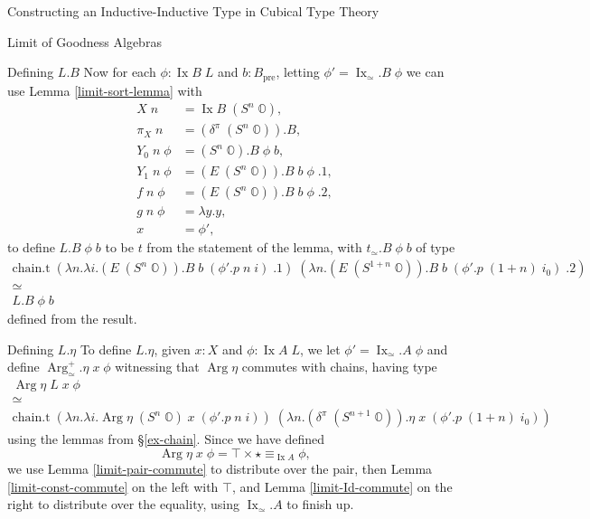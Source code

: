 \documentclass[runningheads]{llncs}
\DeclareMathOperator{\Arg}{Arg}
\DeclareMathOperator{\Ix}{Ix}
\newcommand{\pre}[1]{{#1}_\text{pre}}
\newcommand{\IdA}[3]{{#1}\equiv_{#3}{#2}}
\newcommand{\bbO}{\mathbb{O}}
\begin{document}
\begin{section}{Constructing an Inductive-Inductive Type in Cubical Type Theory}
\begin{subsection}{Limit of Goodness Algebras}
{\begin{subsubsection}{Defining $L.B$}
Now for each $\phi : \Ix B\;L$ and $b : \pre{B}$, letting $\phi' = \Ix_\simeq.B\;\phi$ we can use Lemma \ref{limit-sort-lemma} with \begin{align*}
X\;n &= \Ix B\;(S^n\;\bbO),\\
\pi_X\;n &= (\delta^\pi\;(S^n\;\bbO)).B,\\
Y_0\;n\;\phi &= (S^n\;\bbO).B\;\phi\;b,\\
Y_1\;n\;\phi &= (E\;(S^n\;\bbO)).B\;b\;\phi\;.1,\\
f\;n\;\phi &= (E\;(S^n\;\bbO)).B\;b\;\phi\;.2,\\
g\;n\;\phi &= \lambda y.y,\\
x &= \phi',
\end{align*}
to define $L.B\;\phi\;b$ to be $t$ from the statement of the lemma, with $t_\simeq.B\;\phi\;b$ of type \begin{gather*}
\text{chain.t}\;(\lambda n.\lambda i.(E\;(S^n\;\bbO)).B\;b\;(\phi'.p\;n\;i)\;.1)\;(\lambda n.(E\;(S^{1+n}\;\bbO)).B\;b\;(\phi'.p\;(1+n)\;i_0)\;.2)\\\simeq\\L.B\;\phi\;b
\end{gather*} defined from the result.
\end{subsubsection}

\begin{subsubsection}{Defining $L.\eta$}
To define $L.\eta$, given $x : X$ and $\phi : \Ix A\;L$, we let $\phi' = \Ix_\simeq.A\;\phi$ and define $\Arg_\simeq^+.\eta\;x\;\phi$ witnessing that $\Arg\eta$ commutes with chains, having type
\begin{gather*}
\Arg\eta\;L\;x\;\phi\\
\simeq\\
\text{chain.t}\;(\lambda n.\lambda i.\Arg\eta\;(S^n\;\bbO)\;x\;(\phi'.p\;n\;i))\;(\lambda n.(\delta^\pi\;(S^{n+1}\;\bbO)).\eta\;x\;(\phi'.p\;(1+n)\;i_0))
\end{gather*} using the lemmas from \S\ref{ex-chain}. Since we have defined \[\Arg\eta\;x\;\phi = \top \times \IdA{\star}{\phi}{\Ix A},\] we use Lemma \ref{limit-pair-commute} to distribute over the pair, then Lemma \ref{limit-const-commute} on the left with $\top$, and Lemma \ref{limit-Id-commute} on the right to distribute over the equality, using $\Ix_\simeq.A$ to finish up.


\end{subsubsection}}
\end{subsection}
\end{section}
\end{document}
